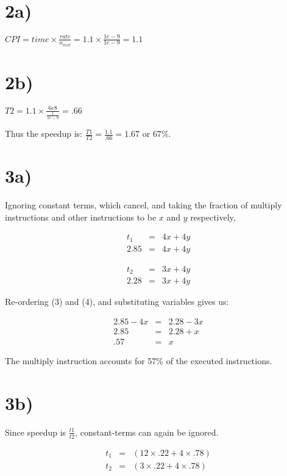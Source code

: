 \documentclass[a4paper,11pt]{article}
\begin{document}

\section*{2a)} 
$CPI = time \times \frac{rate}{n_{inst}} = 1.1 \times \frac{1e-9}{1e-9} = 1.1$

\section*{2b)} 
$T2 = 1.1 \times \frac{6e8}{\frac{1}{1e-9}} = .66$

\noindent Thus the speedup is: $\frac{T1}{T2} = \frac{1.1}{.66} = 1.67$ or $67\%$. 


\section*{3a)}
Ignoring constant terms, which cancel, and taking the fraction of multiply instructions and other instructions to be $x$ and $y$ respectively,

\begin{eqnarray}
t_1 &=& 4x + 4y \\ 
2.85 &=& 4x + 4y 
\end{eqnarray}

\begin{eqnarray}
t_2 &=& 3x + 4y \\
2.28 &=& 3x + 4y
\end{eqnarray}

Re-ordering (3) and (4), and substituting variables gives us:

\begin{eqnarray}
2.85 - 4x &=& 2.28 - 3x \\
2.85 &=& 2.28 + x \\
.57 &=& x
\end{eqnarray}

The multiply instruction accounts for 57\% of the executed instructions.

\section*{3b)}
Since speedup is $\frac{t1}{t2}$, constant-terms can again be ignored.

\begin{eqnarray}
t_1 &=& (12 \times .22 + 4 \times .78) \\
t_2 &=& (3 \times .22 + 4 \times .78)
\end{eqnarray}
\end{document}
